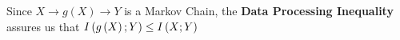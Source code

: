 \documentclass[ClusteringConnectionsMAIN.tex]{subfiles}
\begin{document}
	

  Since $X \longrightarrow g \left( X \right) \longrightarrow Y$ is a Markov Chain, the \textbf{Data Processing Inequality} assures us that $I \left( g \left( X \right); Y \right) \leq I \left( X; Y \right)$
\end{document}
